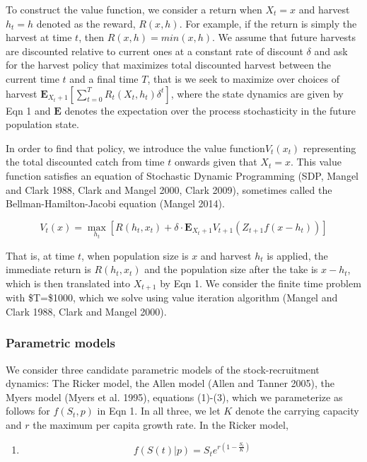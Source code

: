 \documentclass[]{components/elsarticle}
\begin{document}
To construct the value function, we consider a return when $X_t=x$ and
harvest $h_t=h$ denoted as the reward, $R(x,h)$. For example, if the
return is simply the harvest at time $t$, then $R(x,h)=min(x,h)$. We
assume that future harvests are discounted relative to current ones at a
constant rate of discount $\delta$ and ask for the harvest policy that
maximizes total discounted harvest between the current time $t$ and a
final time $T$, that is we seek to maximize over choices of harvest
$\mathbf{E}_{X_t+1} [ \sum_{t = 0}^{T}  R_t(X_t, h_t) \delta^t]$, where
the state dynamics are given by Eqn 1 and $\mathbf{E}$ denotes the
expectation over the process stochasticity in the future population
state.

In order to find that policy, we introduce the value function$V_t(x_t)$
representing the total discounted catch from time $t$ onwards given that
$X_t=x$. This value function satisfies an equation of Stochastic Dynamic
Programming (SDP, Mangel and Clark 1988, Clark and Mangel 2000, Clark
2009), sometimes called the Bellman-Hamilton-Jacobi equation (Mangel
2014).

\begin{equation}
V_t(x) = \max_{h_t} \left[R(h_t, x_t) + \delta \cdot \mathbf{E}_{X_t+1} V_{t+1}( Z_{t+1} f(x - h_t)) \right]
\end{equation}

That is, at time $t$, when population size is $x$ and harvest $h_t$ is
applied, the immediate return is $R(h_t, x_t)$ and the population size
after the take is $x-h_t$, which is then translated into $X_{t+1}$ by
Eqn 1. We consider the finite time problem with \$T=\$1000, which we
solve using value iteration algorithm (Mangel and Clark 1988, Clark and
Mangel 2000).

\subsubsection{Parametric models}\label{parametric-models}

We consider three candidate parametric models of the stock-recruitment
dynamics: The Ricker model, the Allen model (Allen and Tanner 2005), the
Myers model (Myers et al. 1995), equations (1)-(3), which we
parameterize as follows for $f(S_t,p)$ in Eqn 1. In all three, we let
$K$ denote the carrying capacity and $r$ the maximum per capita growth
rate. In the Ricker model,

\begin{enumerate}
\def\labelenumi{(\arabic{enumi})}
\itemsep1pt\parskip0pt
\item
  \[ f(S(t)|p) = S_t e^{r \left(1 - \frac{S_t}{K} \right) } \]
\end{enumerate}
\end{document}
